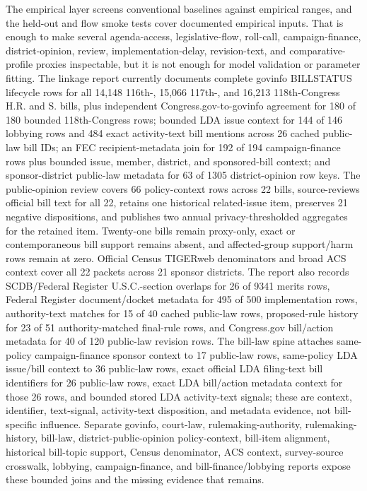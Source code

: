 \documentclass[manuscript]{acmart}
\begin{document}
The empirical layer screens conventional baselines against empirical ranges, and the held-out and flow smoke tests cover documented empirical inputs.
That is enough to make several agenda-access, legislative-flow, roll-call, campaign-finance, district-opinion, review, implementation-delay, revision-text, and comparative-profile proxies inspectable, but it is not enough for model validation or parameter fitting.
The linkage report currently documents complete govinfo BILLSTATUS lifecycle rows for all 14,148 116th-, 15,066 117th-, and 16,213 118th-Congress H.R. and S. bills, plus independent Congress.gov-to-govinfo agreement for 180 of 180 bounded 118th-Congress rows; bounded LDA issue context for 144 of 146 lobbying rows and 484 exact activity-text bill mentions across 26 cached public-law bill IDs; an FEC recipient-metadata join for 192 of 194 campaign-finance rows plus bounded issue, member, district, and sponsored-bill context; and sponsor-district public-law metadata for 63 of 1305 district-opinion row keys. The public-opinion review covers 66 policy-context rows across 22 bills, source-reviews official bill text for all 22, retains one historical related-issue item, preserves 21 negative dispositions, and publishes two annual privacy-thresholded aggregates for the retained item. Twenty-one bills remain proxy-only, exact or contemporaneous bill support remains absent, and affected-group support/harm rows remain at zero. Official Census TIGERweb denominators and broad ACS context cover all 22 packets across 21 sponsor districts. The report also records SCDB/Federal Register U.S.C.-section overlaps for 26 of 9341 merits rows, Federal Register document/docket metadata for 495 of 500 implementation rows, authority-text matches for 15 of 40 cached public-law rows, proposed-rule history for 23 of 51 authority-matched final-rule rows, and Congress.gov bill/action metadata for 40 of 120 public-law revision rows.
The bill-law spine attaches same-policy campaign-finance sponsor context to 17 public-law rows, same-policy LDA issue/bill context to 36 public-law rows, exact official LDA filing-text bill identifiers for 26 public-law rows, exact LDA bill/action metadata context for those 26 rows, and bounded stored LDA activity-text signals; these are context, identifier, text-signal, activity-text disposition, and metadata evidence, not bill-specific influence.
Separate govinfo, court-law, rulemaking-authority, rulemaking-history, bill-law, district-public-opinion policy-context, bill-item alignment, historical bill-topic support, Census denominator, ACS context, survey-source crosswalk, lobbying, campaign-finance, and bill-finance/lobbying reports expose these bounded joins and the missing evidence that remains.
\end{document}
